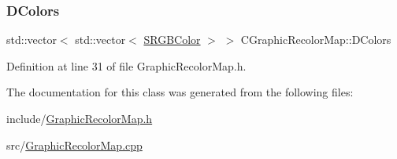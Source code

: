 \subsubsection{\texorpdfstring{D\+Colors}{DColors}}
{\footnotesize\ttfamily std\+::vector$<$ std\+::vector$<$ \hyperlink{structCGraphicRecolorMap_1_1SRGBColor}{S\+R\+G\+B\+Color} $>$ $>$ C\+Graphic\+Recolor\+Map\+::\+D\+Colors\hspace{0.3cm}{\ttfamily [protected]}}



Definition at line 31 of file Graphic\+Recolor\+Map.\+h.



The documentation for this class was generated from the following files\+:\begin{DoxyCompactItemize}
\item 
include/\hyperlink{GraphicRecolorMap_8h}{Graphic\+Recolor\+Map.\+h}\item 
src/\hyperlink{GraphicRecolorMap_8cpp}{Graphic\+Recolor\+Map.\+cpp}\end{DoxyCompactItemize}
